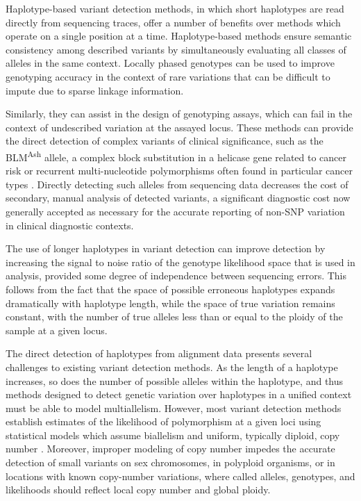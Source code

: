 \documentclass{article}
\begin{document}
Haplotype-based variant detection methods, in which short haplotypes are read directly from sequencing traces, offer a number of benefits over methods which operate on a single position at a time. Haplotype-based methods ensure semantic consistency among described variants by simultaneously evaluating all classes of alleles in the same context. %
Locally phased genotypes can be used to improve genotyping accuracy in the context of rare variations that can be difficult to impute due to sparse linkage information.

Similarly, they can assist in the design of genotyping
assays, which can fail in the context of undescribed variation at the assayed locus.  These methods can provide the direct detection of complex variants of clinical significance, such as the BLM\textsuperscript{Ash} allele, a complex block substitution in a helicase gene related to cancer risk \citep{blmash} or recurrent multi-nucleotide polymorphisms often found in particular cancer types \citep{recurrentTERT2013}.  Directly detecting such alleles from sequencing data decreases the cost of secondary, manual analysis of detected variants, a significant diagnostic cost now generally accepted as necessary for the accurate reporting of non-SNP variation in clinical diagnostic contexts.

The use of longer haplotypes in variant detection can improve detection by increasing the signal to noise ratio of the genotype likelihood space that is used in analysis, provided some degree of independence between sequencing errors.  This follows from the fact that the space of possible erroneous haplotypes expands dramatically with haplotype length, while the space of true variation remains constant, with the number of true alleles less than or equal to the ploidy of the sample at a given locus.

The direct detection of haplotypes from alignment data presents several challenges to existing variant detection methods.  As the length of a haplotype increases, so does the number of possible alleles within the haplotype, and thus methods designed to detect genetic variation over haplotypes in a unified context must be able to model multiallelism.  However, most variant detection methods establish estimates of the likelihood of polymorphism at a given loci using statistical models which assume biallelism \citep{li2011stats,marth99} and uniform, typically diploid, copy number \citep{gatk2011}.  Moreover, improper modeling of copy number impedes the accurate detection of small variants on sex chromosomes, in polyploid organisms, or in locations with known copy-number variations, where called alleles, genotypes, and likelihoods should reflect local copy number and global ploidy.
\end{document}
